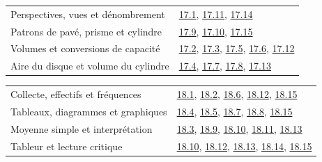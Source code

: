 \begin{tabularx}{\linewidth}{@{}Yl@{}}\toprule
Perspectives, vues et dénombrement & \hyperref[exo-17-1]{17.1}, \hyperref[exo-17-11]{17.11}, \hyperref[exo-17-14]{17.14}\\[2mm]
Patrons de pavé, prisme et cylindre & \hyperref[exo-17-9]{17.9}, \hyperref[exo-17-10]{17.10}, \hyperref[exo-17-15]{17.15}\\[2mm]
Volumes et conversions de capacité & \hyperref[exo-17-2]{17.2}, \hyperref[exo-17-3]{17.3}, \hyperref[exo-17-5]{17.5}, \hyperref[exo-17-6]{17.6}, \hyperref[exo-17-12]{17.12}\\[2mm]
Aire du disque et volume du cylindre & \hyperref[exo-17-4]{17.4}, \hyperref[exo-17-7]{17.7}, \hyperref[exo-17-8]{17.8}, \hyperref[exo-17-13]{17.13}\\[2mm]
\bottomrule\end{tabularx}\par\vspace{4mm}
\begin{tabularx}{\linewidth}{@{}Yl@{}}\toprule
Collecte, effectifs et fréquences & \hyperref[exo-18-1]{18.1}, \hyperref[exo-18-2]{18.2}, \hyperref[exo-18-6]{18.6}, \hyperref[exo-18-12]{18.12}, \hyperref[exo-18-15]{18.15}\\[2mm]
Tableaux, diagrammes et graphiques & \hyperref[exo-18-4]{18.4}, \hyperref[exo-18-5]{18.5}, \hyperref[exo-18-7]{18.7}, \hyperref[exo-18-8]{18.8}, \hyperref[exo-18-15]{18.15}\\[2mm]
Moyenne simple et interprétation & \hyperref[exo-18-3]{18.3}, \hyperref[exo-18-9]{18.9}, \hyperref[exo-18-10]{18.10}, \hyperref[exo-18-11]{18.11}, \hyperref[exo-18-13]{18.13}\\[2mm]
Tableur et lecture critique & \hyperref[exo-18-10]{18.10}, \hyperref[exo-18-12]{18.12}, \hyperref[exo-18-13]{18.13}, \hyperref[exo-18-14]{18.14}, \hyperref[exo-18-15]{18.15}\\[2mm]
\bottomrule\end{tabularx}\par\vspace{4mm}
\clearpage
{}\fontsize{10}{13}\selectfont
